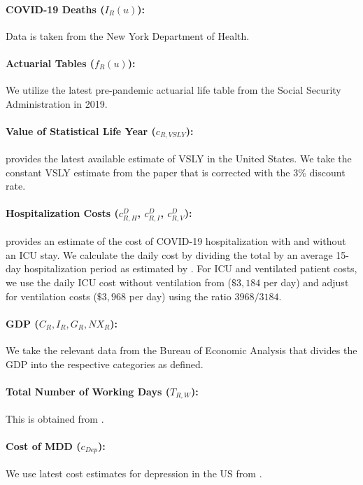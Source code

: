 \documentclass[msom,blindrev]{informs3} %
\begin{document}
\begin{APPENDICES}
\paragraph{COVID-19 Deaths ($I_R(u)$):} Data is taken from the New York Department of Health. 
\paragraph{Actuarial Tables ($f_R(u)$):} We utilize the latest pre-pandemic actuarial life table from the Social Security Administration in 2019. 
\paragraph{Value of Statistical Life Year ($c_{R,VSLY}$):}  provides the latest available estimate of VSLY in the United States. We take the constant VSLY estimate from the paper that is corrected with the $3\%$ discount rate.
\paragraph{Hospitalization Costs ($c^D_{R,H}$, $c^D_{R,I}$, $c^D_{R,V}$):}  provides an estimate of the cost of COVID-19 hospitalization with and without an ICU stay. We calculate the daily cost by dividing the total by an average 15-day hospitalization period as estimated by . For ICU and ventilated patient costs, we use the daily ICU cost without ventilation from  ($\$3,184$ per day) and adjust for ventilation costs ($\$3,968$ per day) using the ratio $3968/3184$.


\paragraph{GDP ($C_R, I_R, G_R, NX_R$):} We take the relevant data from the Bureau of Economic Analysis that divides the GDP into the respective categories as defined. 
\paragraph{Total Number of Working Days ($T_{R,W}$):} This is obtained from \cite{BEA20}.

\paragraph{Cost of MDD ($c_{Dep}$):} We use latest cost estimates for depression in the US from .



\end{APPENDICES}
\end{document}
